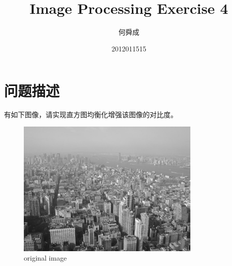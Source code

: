 \documentclass[UTF8]{ctexart}
\author{何舜成}
\date{2012011515}
\title{Image Processing Exercise 4}
\begin{document}
\maketitle
\section{问题描述}
有如下图像，请实现直方图均衡化增强该图像的对比度。\par
\begin{figure}[htbp]
\centerline{\includegraphics[width=3.5in]{hw4.jpg}}
\caption[]{original image}
\end{figure}
\end{document}
